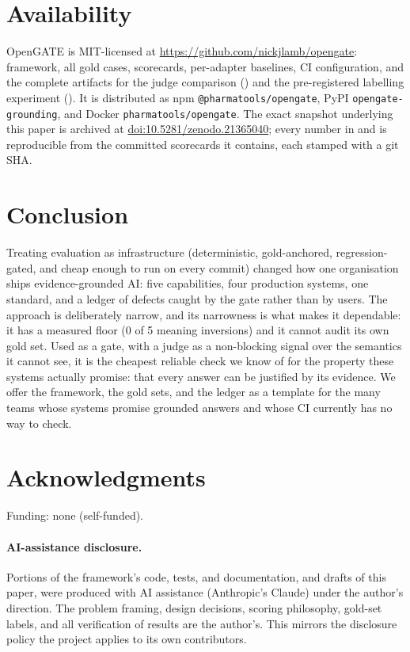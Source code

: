 \documentclass[11pt,a4paper]{article}
\begin{document}
\section{Availability}

OpenGATE is MIT-licensed at \url{https://github.com/nickjlamb/opengate}: framework, all gold cases,
scorecards, per-adapter baselines, CI configuration, and the complete artifacts for the judge
comparison () and the pre-registered labelling experiment (). It is
distributed as npm \texttt{@pharmatools/opengate}, PyPI \texttt{opengate-grounding}, and Docker
\texttt{pharmatools/opengate}. The exact snapshot underlying this paper is archived at
\href{https://doi.org/10.5281/zenodo.21365040}{doi:10.5281/zenodo.21365040}; every number in
 and  is reproducible from the committed scorecards it contains,
each stamped with a git SHA.

\section{Conclusion}

Treating evaluation as infrastructure (deterministic, gold-anchored, regression-gated, and cheap
enough to run on every commit) changed how one organisation ships evidence-grounded AI: five
capabilities, four production systems, one standard, and a ledger of defects caught by the gate rather
than by users. The approach is deliberately narrow, and its narrowness is what makes it dependable: it
has a measured floor (0 of 5 meaning inversions) and it cannot audit its own gold set. Used as a gate,
with a judge as a non-blocking signal over the semantics it cannot see, it is the cheapest reliable
check we know of for the property these systems actually promise: that every answer can be justified
by its evidence. We offer the framework, the gold sets, and the ledger as a template for the many teams
whose systems promise grounded answers and whose CI currently has no way to check.

\section*{Acknowledgments}

Funding: none (self-funded).

\paragraph{AI-assistance disclosure.}
Portions of the framework's code, tests, and documentation, and drafts of this paper, were produced
with AI assistance (Anthropic's Claude) under the author's direction. The problem framing, design
decisions, scoring philosophy, gold-set labels, and all verification of results are the author's. This
mirrors the disclosure policy the project applies to its own contributors.


\renewcommand{\refname}{References}

\end{document}
